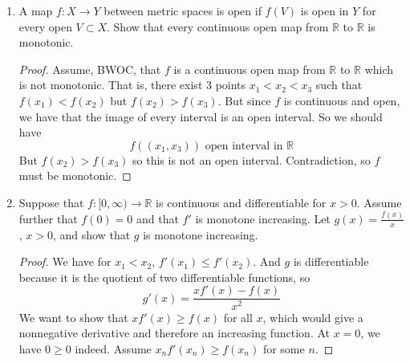 \documentclass[hidelinks,12pt]{article}
\renewcommand{\geq}{\geqslant}
\renewcommand{\leq}{\leqslant}
\newcommand{\R}{\mathbb{R}}
\begin{document}
\begin{enumerate}
\begin{proof}
\[           \sigma_{n}=\frac{1}{n+1}\left(\sum_{k=0}^{N-1}s_{k}+(n-N+1)\cdot s+\sum_{k=N}^{n}(s_{k}-s)\right)
       \]
       Then, as \(n\to\infty\), the first sum is finite so it is negligible. The second sum tends to 0 because past \(N\), \(s_{k}\) is epsilon-close to \(s\). Therefore, in passing to the limit, we get:
       \[
       \lim_{n\to\infty}\sigma_{n}=\lim_{n\to\infty}\frac{(n-N+1)\cdot s}{n+1}=s
       \]
        \end{proof}
        An example when the converse is not true is the sequence \((s_{n})\) where \[
        s_{n}=\begin{cases}
         0& \text{if n even}\\
         1& \text{if n odd}\\
        \end{cases}
        \]
       Has arithmetic mean \(\frac{1}{2}\), but the limit of \(s_{n}\) does not exist. 
    \item A map \(f:X\to Y\) between metric spaces is open if \(f(V)\) is open in \(Y\) for every open \(V\subset X\). Show that every continuous open map from \(\R\) to \(\R\) is monotonic.
        \begin{proof}
        Assume, BWOC, that \(f\) is a continuous open map from \(\R\) to \(\R\) which is not monotonic. That is, there exist 3 points \(x_{1}<x_{2}<x_{3}\) such that \(f(x_{1})<f(x_{2})\) but \(f(x_{2})>f(x_{3})\). But since \(f\) is continuous and open, we have that the image of every interval is an open interval. So we should have \[
            f((x_{1},x_{3}))\text{ open interval in }\R
        \]
       But \(f(x_{2})>f(x_{3})\) so this is not an open interval. Contradiction, so \(f\) must be monotonic.
        \end{proof}
    \item Suppose that \(f:[0,\infty)\to\R\) is continuous and differentiable for \(x>0\). Assume further that \(f(0)=0\) and that \(f'\) is monotone increasing. Let \(g(x)=\frac{f(x)}{x}\), \(x>0\), and show that \(g\) is monotone increasing.
        \begin{proof}
        We have for \(x_{1}<x_{2}\), \(f'(x_{1})\leq f'(x_{2})\). And \(g\) is differentiable because it is the quotient of two differentiable functions, so
        \[
        g'(x)=\frac{xf'(x)-f(x)}{x^{2}}
        \]
       We want to show that \(xf'(x)\geq f(x)\) for all \(x\), which would give a nonnegative derivative and therefore an increasing function. At \(x=0\), we have \(0\geq0\) indeed. Assume \(x_{n}f'(x_{n})\geq f(x_{n})\) for some \(n\).

\end{proof}
\end{enumerate}
\end{document}
